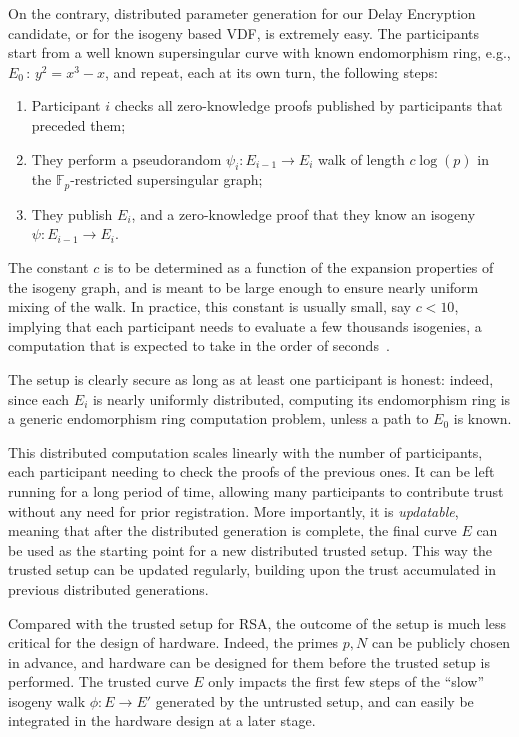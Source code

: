 \documentclass{llncs}
\newcommand{\F}{\mathbb{F}}
\begin{document}
On the contrary, distributed parameter generation for our Delay
Encryption candidate, or for the isogeny based VDF, is extremely
easy. %
The participants start from a well known supersingular curve with
known endomorphism ring, e.g., $E_0\,:\,y^2=x^3-x$, and repeat, each
at its own turn, the following steps:
\begin{enumerate}
\item Participant $i$ checks all zero-knowledge proofs published by
  participants that preceded them;
\item They perform a pseudorandom $\psi_i:E_{i-1}\to E_i$
  walk of length $c\log(p)$ in the $\F_p$-restricted supersingular
  graph;
\item They publish $E_i$, and a zero-knowledge proof that they know an
  isogeny $\psi:E_{i-1}\to E_i$.
\end{enumerate}

The constant $c$ is to be determined as a function of the expansion
properties of the isogeny graph, and is meant to be large enough to
ensure nearly uniform mixing of the walk. %
In practice, this constant is usually small, say $c<10$, implying that
each participant needs to evaluate a few thousands isogenies, a
computation that is expected to take in the order of
seconds~\cite{10.1007/978-3-030-03332-3_15}.

The setup is clearly secure as long as at least one participant is
honest: indeed, since each $E_i$ is nearly uniformly distributed,
computing its endomorphism ring is a generic endomorphism ring
computation problem, unless a path to $E_0$ is known.

This distributed computation scales linearly with the number of
participants, each participant needing to check the proofs of the
previous ones. %
It can be left running for a long period of time, allowing many
participants to contribute trust without any need for prior
registration. %
More importantly, it is \emph{updatable}, meaning that after the
distributed generation is complete, the final curve $E$ can be used as
the starting point for a new distributed trusted setup. %
This way the trusted setup can be updated regularly, building upon the
trust accumulated in previous distributed generations.

Compared with the trusted setup for RSA, the outcome of the setup is
much less critical for the design of hardware. %
Indeed, the primes $p,N$ can be publicly chosen in advance, and
hardware can be designed for them before the trusted setup is
performed. %
The trusted curve $E$ only impacts the first few steps of the ``slow''
isogeny walk $\phi:E\to E'$ generated by the untrusted setup, and can
easily be integrated in the hardware design at a later stage.
\end{document}
